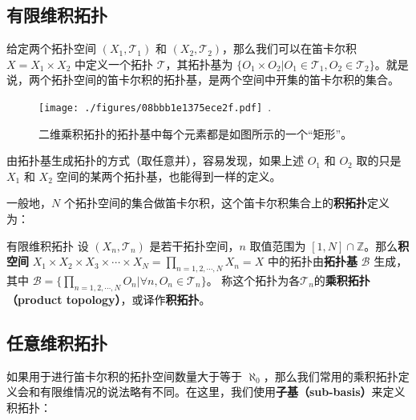 

\subsection{有限维积拓扑}

给定两个拓扑空间 $(X_1, \mathcal{T}_1)$ 和 $(X_2, \mathcal{T}_2)$，那么我们可以在笛卡尔积 $X=X_1\times X_2$ 中定义一个拓扑 $\mathcal{T}$，其拓扑基为 $\{O_1\times O_2|O_1\in\mathcal{T_1}, O_2\in\mathcal{T_2}\}$。就是说，两个拓扑空间的笛卡尔积的拓扑基，是两个空间中开集的笛卡尔积的集合。

\begin{figure}[ht]
\centering
\texttt{[image: ./figures/08bbb1e1375ece2f.pdf]}~.
\caption{二维乘积拓扑的拓扑基中每个元素都是如图所示的一个“矩形”。} \label{fig_Topo6_2}
\end{figure}

由拓扑基生成拓扑的方式（取任意并），容易发现，如果上述 $O_1$ 和 $O_2$ 取的只是 $X_1$ 和 $X_2$ 空间的某两个拓扑基，也能得到一样的定义。

一般地，$N$ 个拓扑空间的集合做笛卡尔积，这个笛卡尔积集合上的\textbf{积拓扑}定义为：

\begin{definition}{有限维积拓扑}
设 $(X_n, \mathcal{T}_n)$ 是若干拓扑空间，$n$ 取值范围为 $[1, N]\cap\mathbb{Z}$。那么\textbf{积空间} $X_1\times X_2\times X_3\times\cdots\times X_N=\prod\limits_{n=1,2,\cdots,N}X_n=X$ 中的拓扑由\textbf{拓扑基} $\mathcal{B}$ 生成，其中 $\mathcal{B}=\{\prod\limits_{n=1,2,\cdots,N}O_n|\forall n, O_n\in\mathcal{T}_n\}$。
称这个拓扑为各$\mathcal{T}_n$的\textbf{乘积拓扑（product topology）}，或译作\textbf{积拓扑}。
\end{definition}

\subsection{任意维积拓扑}

如果用于进行笛卡尔积的拓扑空间数量大于等于 $\aleph_0$，那么我们常用的乘积拓扑定义会和有限维情况的说法略有不同。在这里，我们使用\textbf{子基（sub-basis）}来定义积拓扑：

